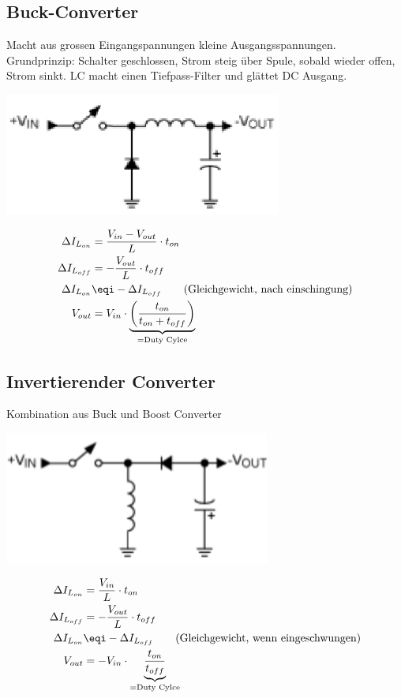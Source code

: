 \subsection{Buck-Converter}
Macht aus grossen Eingangspannungen kleine Ausgangsspannungen. Grundprinzip: Schalter geschlossen, Strom steig über Spule, sobald wieder offen, Strom sinkt. LC macht einen Tiefpass-Filter und glättet DC Ausgang.
\begin{center}
	\includegraphics[width=0.4\columnwidth]{Images/buck}
\end{center}
\begin{align*}
	\Delta I_{L_{on}} &= \frac{V_{in} - V_{out}}{L}\cdot t_{on} \\
	\Delta I_{L_{off}} &= -\frac{V_{out}}{L}\cdot t_{off} \\
	\Delta I_{L_{on}} &\eqi - \Delta I_{L_{off}} \qquad \text{(Gleichgewicht, nach einschingung)} \\
	V_{out} &= V_{in} \cdot \underbrace{\left(\frac{t_{on}}{t_{on} + t_{off}}\right)}_{=\text{Duty Cylce}}
\end{align*}

\subsection{Invertierender Converter}
Kombination aus Buck und Boost Converter
\begin{center}
	\includegraphics[width=0.4\columnwidth]{Images/inverter}
\end{center}
\begin{align*}
	\Delta I_{L_{on}} &= \frac{V_{in}}{L}\cdot t_{on} \\
	\Delta I_{L_{off}} &= -\frac{V_{out}}{L}\cdot t_{off} \\
	\Delta I_{L_{on}} &\eqi - \Delta I_{L_{off}} \qquad \text{(Gleichgewicht, wenn eingeschwungen)} \\
	V_{out} &= -V_{in} \cdot \underbrace{\frac{t_{on}}{t_{off}}}_{=\text{Duty Cylce}}
\end{align*}

